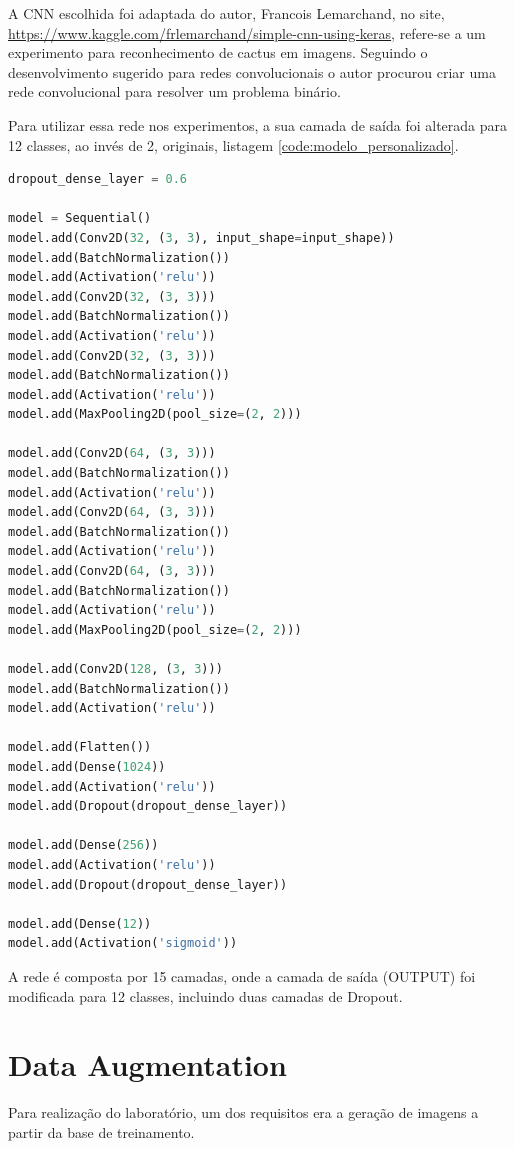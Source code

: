 \documentclass[12pt,
	english,			%
	french,				%
	spanish,			%
	brazil,				%
	]{article}
\begin{document}
A CNN escolhida foi adaptada do autor, Francois Lemarchand, no site, \url{https://www.kaggle.com/frlemarchand/simple-cnn-using-keras}, refere-se a um experimento para reconhecimento de cactus em imagens. Seguindo o desenvolvimento sugerido para redes convolucionais o autor procurou criar uma rede convolucional para resolver um problema binário. 

Para utilizar essa rede nos experimentos, a sua camada de saída foi alterada para 12 classes, ao invés de 2, originais, listagem \ref{code:modelo_personalizado}.

\begin{lstlisting}[caption={Modelo da Outra CNN},captionpos=b,frame=single,label={code:modelo_personalizado}, language=Python]
dropout_dense_layer = 0.6

model = Sequential()
model.add(Conv2D(32, (3, 3), input_shape=input_shape))
model.add(BatchNormalization())
model.add(Activation('relu'))
model.add(Conv2D(32, (3, 3)))
model.add(BatchNormalization())
model.add(Activation('relu'))
model.add(Conv2D(32, (3, 3)))
model.add(BatchNormalization())
model.add(Activation('relu'))
model.add(MaxPooling2D(pool_size=(2, 2)))

model.add(Conv2D(64, (3, 3)))
model.add(BatchNormalization())
model.add(Activation('relu'))
model.add(Conv2D(64, (3, 3)))
model.add(BatchNormalization())
model.add(Activation('relu'))
model.add(Conv2D(64, (3, 3)))
model.add(BatchNormalization())
model.add(Activation('relu'))
model.add(MaxPooling2D(pool_size=(2, 2)))

model.add(Conv2D(128, (3, 3)))
model.add(BatchNormalization())
model.add(Activation('relu'))

model.add(Flatten())
model.add(Dense(1024))
model.add(Activation('relu'))
model.add(Dropout(dropout_dense_layer))

model.add(Dense(256))
model.add(Activation('relu'))
model.add(Dropout(dropout_dense_layer))

model.add(Dense(12))
model.add(Activation('sigmoid'))
\end{lstlisting}

A rede é composta por 15 camadas, onde a camada de saída (OUTPUT) foi modificada para 12 classes, incluindo duas camadas de Dropout.

\section{Data Augmentation}\label{section:data_augmented}

Para realização do laboratório, um dos requisitos era a geração de imagens a partir da base de treinamento. 
\end{document}
